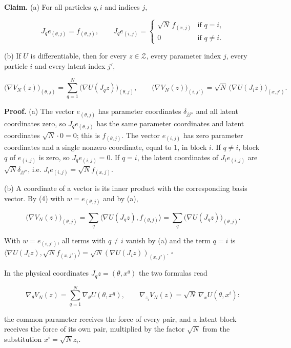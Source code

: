 \documentclass[11pt,a4paper]{article}
\begin{document}
\textbf{Claim.} (a) For all particles \(q,i\) and indices \(j\),


\[J_qe_{(\theta,j)}=f_{(\theta,j)},\qquad J_qe_{(i,j)}=\begin{cases}\sqrt N\,f_{(x,j)}&\text{if }q=i,\\0&\text{if }q\neq i.\end{cases}\]


(b) If \(U\) is differentiable, then for every \(z\in\mathcal Z\), every parameter index \(j\), every particle \(i\) and every latent index \(j'\),


\[\bigl(\nabla V_N(z)\bigr)_{(\theta,j)}=\sum_{q=1}^N\bigl(\nabla U(J_qz)\bigr)_{(\theta,j)},\qquad\bigl(\nabla V_N(z)\bigr)_{(i,j')}=\sqrt N\,\bigl(\nabla U(J_iz)\bigr)_{(x,j')} .\]


\textbf{Proof.} (a) The vector \(e_{(\theta,j)}\) has parameter coordinates \(\delta_{jj''}\) and all latent coordinates zero, so \(J_qe_{(\theta,j)}\) has the same parameter coordinates and latent coordinates \(\sqrt N\cdot0=0\); this is \(f_{(\theta,j)}\). The vector \(e_{(i,j)}\) has zero parameter coordinates and a single nonzero coordinate, equal to \(1\), in block \(i\). If \(q\ne i\), block \(q\) of \(e_{(i,j)}\) is zero, so \(J_qe_{(i,j)}=0\). If \(q=i\), the latent coordinates of \(J_ie_{(i,j)}\) are \(\sqrt N\delta_{jj''}\), i.e. \(J_ie_{(i,j)}=\sqrt Nf_{(x,j)}\).




(b) A coordinate of a vector is its inner product with the corresponding basis vector. By (4) with \(w=e_{(\theta,j)}\) and by (a),


\[\bigl(\nabla V_N(z)\bigr)_{(\theta,j)}=\sum_q\bigl\langle\nabla U(J_qz),f_{(\theta,j)}\bigr\rangle=\sum_q\bigl(\nabla U(J_qz)\bigr)_{(\theta,j)} .\]


With \(w=e_{(i,j')}\), all terms with \(q\ne i\) vanish by (a) and the term \(q=i\) is \(\langle\nabla U(J_iz),\sqrt Nf_{(x,j')}\rangle=\sqrt N(\nabla U(J_iz))_{(x,j')}\). \(\square\)




In the physical coordinates \(J_qz=(\theta,x^q)\) the two formulas read


\[\nabla_\theta V_N(z)=\sum_{q=1}^N\nabla_\theta U(\theta,x^q),\qquad\nabla_{z_i}V_N(z)=\sqrt N\,\nabla_xU(\theta,x^i):\]


the common parameter receives the force of every pair, and a latent block receives the force of its own pair, multiplied by the factor \(\sqrt N\) from the substitution \(x^i=\sqrt Nz_i\).
\end{document}
